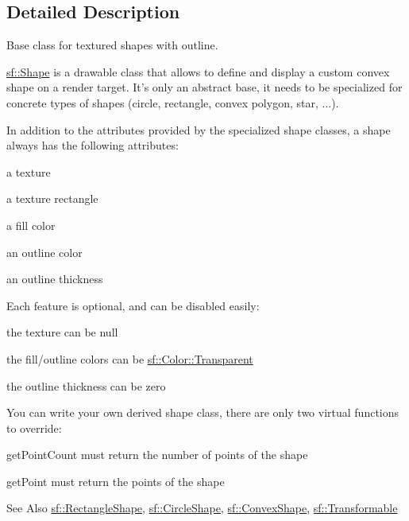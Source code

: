 \subsection{Detailed Description}
Base class for textured shapes with outline. 

\hyperlink{classsf_1_1_shape}{sf\-::\-Shape} is a drawable class that allows to define and display a custom convex shape on a render target. It's only an abstract base, it needs to be specialized for concrete types of shapes (circle, rectangle, convex polygon, star, ...).

In addition to the attributes provided by the specialized shape classes, a shape always has the following attributes\-: \begin{DoxyItemize}
\item a texture \item a texture rectangle \item a fill color \item an outline color \item an outline thickness\end{DoxyItemize}
Each feature is optional, and can be disabled easily\-: \begin{DoxyItemize}
\item the texture can be null \item the fill/outline colors can be \hyperlink{classsf_1_1_color_a422c310394afa396d3a2798aad982145}{sf\-::\-Color\-::\-Transparent} \item the outline thickness can be zero\end{DoxyItemize}
You can write your own derived shape class, there are only two virtual functions to override\-: \begin{DoxyItemize}
\item get\-Point\-Count must return the number of points of the shape \item get\-Point must return the points of the shape\end{DoxyItemize}
\begin{DoxySeeAlso}{See Also}
\hyperlink{classsf_1_1_rectangle_shape}{sf\-::\-Rectangle\-Shape}, \hyperlink{classsf_1_1_circle_shape}{sf\-::\-Circle\-Shape}, \hyperlink{classsf_1_1_convex_shape}{sf\-::\-Convex\-Shape}, \hyperlink{classsf_1_1_transformable}{sf\-::\-Transformable} 
\end{DoxySeeAlso}


